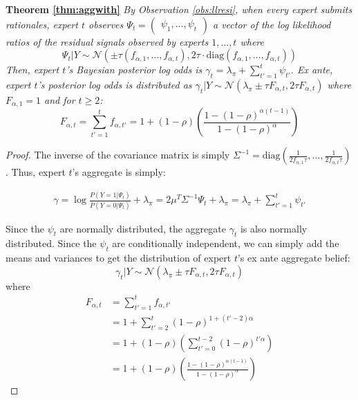 \documentclass{winnower}
\begin{document}
\noindent\textbf{Theorem \ref{thm:aggwith}}
\emph{By Observation \ref{obs:llresi}, when every expert submits rationales, expert $t$ observes $\Psi_{t} = \begin{pmatrix} {\psi}_1, \ldots, {\psi}_{t} \end{pmatrix}$ a vector of the log likelihood ratios of the residual signals observed by experts $1, \ldots, t$ where}
{\small
\begin{equation}
\Psi_{t}|Y \sim \mathcal{N}\left(\pm \tau \left(f_{\alpha, 1}, \ldots, f_{\alpha, t}\right), 2\tau \cdot \text{diag}\left(f_{\alpha, 1}, \ldots, f_{\alpha, t}\right)\right)
\end{equation}
}
\emph{Then, expert $t$'s Bayesian posterior log odds is $\gamma_t = \lambda_\pi + \sum_{t'=1}^t \psi_{t'}$. Ex ante, expert $t$'s posterior log odds is distributed as $\gamma_t|Y \sim \mathcal{N}\left(\lambda_\pi \pm \tau F_{\alpha,t}, 2\tau F_{\alpha,t}\right)$ where $F_{\alpha, 1}=1$ and for $t\geq 2$:}
{\small
\begin{equation}
F_{\alpha,t} = \sum_{t'=1}^t f_{\alpha,t'} = 1 + (1-\rho)\left(\frac{1-(1-\rho)^{\alpha(t-1)}}{1-(1-\rho)^\alpha}\right)
\end{equation}
}

\begin{proof} The inverse of the covariance matrix is simply $\Sigma^{-1} = \text{diag}\left(\frac{1}{2f_{\alpha, 1}\tau}, \ldots, \frac{1}{2f_{\alpha, t}\tau}\right)$. Thus, expert $t$'s aggregate is simply:

{\small
\begin{equation}
\begin{split}
    \gamma = \log \frac{P(Y= 1| \Psi_t)}{P(Y= 0|\Psi_t)} + \lambda_\pi = 2{\mu}^T\Sigma^{-1}{\Psi_t} + \lambda_\pi  = \lambda_\pi + 
    \sum_{t'=1}^t \psi_{t'}
    \end{split}
\end{equation}
}

Since the $\psi_t$ are normally distributed, the aggregate $\gamma_t$ is also normally distributed. Since the $\psi_t$ are conditionally independent, we can simply add the means and variances to get the distribution of expert $t$'s ex ante aggregate belief:
{\small
\begin{equation}
    \gamma_t | Y \sim \mathcal{N}\left(\lambda_\pi \pm \tau F_{\alpha,t}, 2\tau F_{\alpha,t} \right)
\end{equation}
}
where 
{\small
\begin{equation}
    \begin{split}
        F_{\alpha,t} &= \sum_{t'=1}^t f_{\alpha, t'} \\
        &= 1 + \sum_{t'=2}^t (1-\rho)^{1+(t'-2)\alpha} \\
        &= 1 + (1-\rho)\left(\sum_{t'=0}^{t-2} (1-\rho)^{t'\alpha}\right) \\
        &= 1 + (1-\rho)\left(\frac{1-(1-\rho)^{\alpha(t-1)}}{1-(1-\rho)^\alpha}\right)
    \end{split}
\end{equation}
}
\end{proof}
\end{document}
